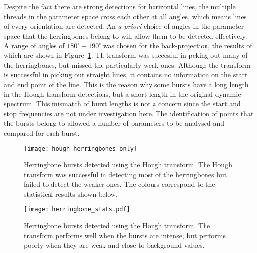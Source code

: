 Despite the fact there are strong detections for horizontal lines, the multiple threads in the parameter space cross each other at all angles, which means lines of every orientation are detected. An {\it a priori} choice of angles in the parameter space that the herringbones belong to will allow them to be detected effectively. A range of angles of $180^{\circ}-190^{\circ}$ was chosen for the back-projection, the results of which are shown in Figure~\ref{fig:hough_hb}. Th transform was succesful in pcking out many of the herringbones, but missed the particularly weak ones. Although the transform is successful in picking out straight lines, it contains no information on the start and end point of the line. This is the reason why some bursts have a long length in the Hough transform detections, but a short length in the original dynamic spectrum. This mismatch of burst lengths is not a concern since the start and stop frequencies are not under investigation here. The identification of points that the bursts belong to allowed a number of parameters to be analysed and compared for each burst.
%
%
\begin{figure}[t!]
\begin{center}
\texttt{[image: hough\_herringbones\_only]}
\caption[Hough transform herringbones]{Herringbone bursts detected using the Hough transform. The Hough transform was successful in detecting most of the herringbones but failed to detect the weaker ones. The colours correspond to the statistical results shown below.}
\label{fig:hough_hb}
\end{center}
\end{figure}
%
%
\begin{figure}[t!]
\begin{center}
\texttt{[image: herringbone\_stats.pdf]}
\caption[Herringbone statistics]{Herringbone bursts detected using the Hough transform. The transform performs well when the bursts are intense, but performs poorly when they are weak and close to background values.}
\label{fig:bibf}
\end{center}
\end{figure}



